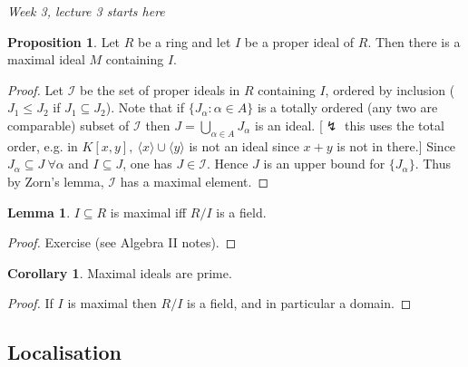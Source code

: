 \documentclass[a4paper]{article}
\newcommand{\la}{\langle}
\newcommand{\ra}{\rangle}
\theoremstyle{definition}
\newtheorem{prop}[defn]{Proposition}
\newtheorem{lemma}[defn]{Lemma}
\newtheorem{coro}[defn]{Corollary}
\begin{document}
\begin{flushright}
\textit{Week 3, lecture 3 starts here}
\end{flushright}

\begin{prop}
Let $R$ be a ring and let $I$ be a proper ideal of $R$. Then there is a maximal ideal $M$ containing $I$.
\end{prop}
\begin{proof}
Let $\mathcal I$ be the set of proper ideals in $R$ containing $I$, ordered by inclusion ($J_1\leq J_2$ if $J_1\subseteq J_2$). Note that if $\{J_\alpha:\alpha\in A\}$ is a totally ordered (any two are comparable) subset of $\mathcal I$ then $J=\bigcup_{\alpha\in A}J_\alpha$ is an ideal. [$\lightning$ this uses the total order, e.g. in $K[x,y],\ \la x\ra \cup\la y\ra$ is not an ideal since $x+y$ is not in there.] Since $J_\alpha\subseteq J \ \forall \alpha$ and $I\subseteq J$, one has $J\in \mathcal I$. Hence $J$ is an upper bound for $\{J_\alpha\}$. Thus by Zorn's lemma, $\mathcal I$ has a maximal element.
\end{proof}

\begin{lemma}
$I\subseteq R$ is maximal iff $R/I$ is a field.
\end{lemma}
\begin{proof}
Exercise (see Algebra II notes).
\end{proof}

\begin{coro}
Maximal ideals are prime.
\end{coro}
\begin{proof}
If $I$ is maximal then $R/I$ is a field, and in particular a domain.
\end{proof}

\subsection{Localisation}
\end{document}
